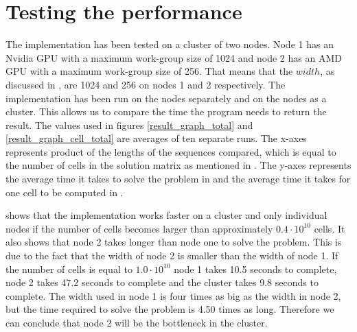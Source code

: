 \section{Testing the performance} \label{testing}

\begin{figure*}[htb]
    \centering
    \subfloat[][Overview]{\label{result_graph}}%
    \subfloat[][Zoomed in]{\label{result_graph_zoom}}
    \caption{Average time to compute edit distance} \label{result_graph_total}
\end{figure*}

\begin{figure*}[htb]
    \centering
    \subfloat[][Overview]{\label{result_graph_cell}}%
    \subfloat[][Zoomed in]{\label{result_graph_cell_zoom}}
    \caption{Average time per cell} \label{result_graph_cell_total}
\end{figure*}

The implementation has been tested on a cluster of two nodes.
Node 1 has an Nvidia GPU with a maximum work-group size of 1024 and node 2 has an AMD GPU with a maximum work-group size of 256.
That means that the $width$, as discussed in , are 1024 and 256 on nodes 1 and 2 respectively.
The implementation has been run on the nodes separately and on the nodes as a cluster.
This allows us to compare the time the program needs to return the result.
The values used in figures \ref{result_graph_total} and \ref{result_graph_cell_total} are averages of ten separate runs.
The x-axes represents product of the lengths of the sequences compared, which is equal to the number of cells in the solution matrix as mentioned in .
The y-axes represents the average time it takes to solve the problem in  and the average time it takes for one cell to be computed in .

 shows that the implementation works faster on a cluster and only individual nodes if the number of cells becomes larger than approximately $0.4 \cdot 10^{10}$ cells.
It also shows that node 2 takes longer than node one to solve the problem.
This is due to the fact that the width of node 2 is smaller than the width of node 1.
If the number of cells is equal to $1.0 \cdot 10^{10}$ node 1 takes 10.5 seconds to complete, node 2 takes 47.2 seconds to complete and the cluster takes 9.8 seconds to complete.
The width used in node 1 is four times as big as the width in node 2, but the time required to solve the problem is 4.50 times as long.
Therefore we can conclude that node 2 will be the bottleneck in the cluster.

